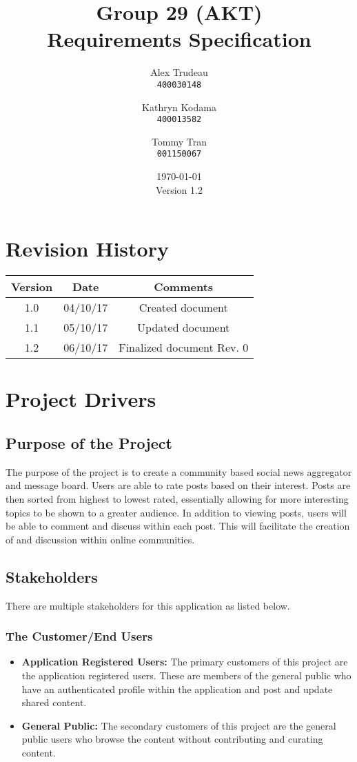 \documentclass[12pt,fleqn]{article}
\title{Group 29 (AKT)\\ Requirements Specification}
\author{
Alex Trudeau\\
	\texttt{400030148}
\and
Kathryn Kodama\\
  	\texttt{400013582}
\and
Tommy Tran\\
	\texttt{001150067}
}
\date{\today\\Version 1.2}
\begin{document}
\maketitle

\pagebreak
\tableofcontents

\section* {Revision History}

\begin{tabular}{ |c| c| c| }
\hline
Version & Date & Comments \\
\hline
1.0 & 04/10/17 & Created document \\
\hline
1.1 & 05/10/17 & Updated document \\
\hline
1.2 & 06/10/17 & Finalized document Rev. 0 \\
\hline
\end{tabular}


\pagebreak

\section {Project Drivers}

\subsection {Purpose of the Project}
The purpose of the project is to create a community based social news aggregator and message board. Users are able to rate posts based on their interest. Posts are then sorted from highest to lowest rated, essentially allowing for more interesting topics to be shown to a greater audience. In addition to viewing posts, users will be able to comment and discuss within each post.  This will facilitate the creation of and discussion within online communities.

\subsection {Stakeholders}

There are multiple stakeholders for this application as listed below.

\subsubsection* {The Customer/End Users}
\begin{itemize} 
\item \textbf{Application Registered Users: }The primary customers of this project are the application registered users. These are members of the general public who have an authenticated profile within the application and post and update shared content.
\item \textbf{General Public: }The secondary customers of this project are the general public users who browse the content without contributing and curating content.
\end{itemize}
\end{document}
